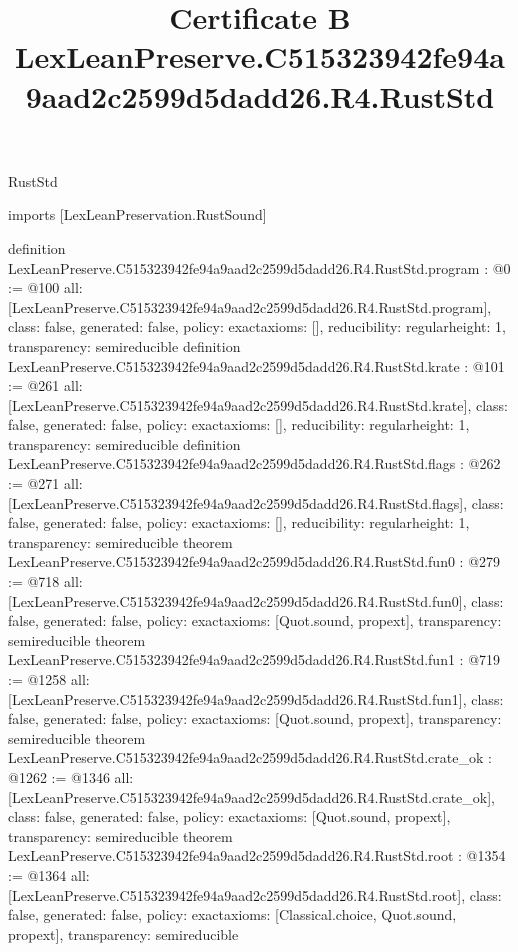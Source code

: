 \begin{lexlean}{RustStd}
\title{Certificate B LexLeanPreserve.C515323942fe94a9aad2c2599d5dadd26.R4.RustStd}
\begin{coremodule}
imports [LexLeanPreservation.RustSound]

definition LexLeanPreserve.C515323942fe94a9aad2c2599d5dadd26.R4.RustStd.program : @0 := @100 {
  all: [LexLeanPreserve.C515323942fe94a9aad2c2599d5dadd26.R4.RustStd.program],
  class: false,
  generated: false,
  policy: exact{axioms: []},
  reducibility: regular{height: 1},
  transparency: semireducible
}
definition LexLeanPreserve.C515323942fe94a9aad2c2599d5dadd26.R4.RustStd.krate : @101 := @261 {
  all: [LexLeanPreserve.C515323942fe94a9aad2c2599d5dadd26.R4.RustStd.krate],
  class: false,
  generated: false,
  policy: exact{axioms: []},
  reducibility: regular{height: 1},
  transparency: semireducible
}
definition LexLeanPreserve.C515323942fe94a9aad2c2599d5dadd26.R4.RustStd.flags : @262 := @271 {
  all: [LexLeanPreserve.C515323942fe94a9aad2c2599d5dadd26.R4.RustStd.flags],
  class: false,
  generated: false,
  policy: exact{axioms: []},
  reducibility: regular{height: 1},
  transparency: semireducible
}
theorem LexLeanPreserve.C515323942fe94a9aad2c2599d5dadd26.R4.RustStd.fun0 : @279 := @718 {
  all: [LexLeanPreserve.C515323942fe94a9aad2c2599d5dadd26.R4.RustStd.fun0],
  class: false,
  generated: false,
  policy: exact{axioms: [Quot.sound, propext]},
  transparency: semireducible
}
theorem LexLeanPreserve.C515323942fe94a9aad2c2599d5dadd26.R4.RustStd.fun1 : @719 := @1258 {
  all: [LexLeanPreserve.C515323942fe94a9aad2c2599d5dadd26.R4.RustStd.fun1],
  class: false,
  generated: false,
  policy: exact{axioms: [Quot.sound, propext]},
  transparency: semireducible
}
theorem LexLeanPreserve.C515323942fe94a9aad2c2599d5dadd26.R4.RustStd.crate_ok : @1262 := @1346 {
  all: [LexLeanPreserve.C515323942fe94a9aad2c2599d5dadd26.R4.RustStd.crate_ok],
  class: false,
  generated: false,
  policy: exact{axioms: [Quot.sound, propext]},
  transparency: semireducible
}
theorem LexLeanPreserve.C515323942fe94a9aad2c2599d5dadd26.R4.RustStd.root : @1354 := @1364 {
  all: [LexLeanPreserve.C515323942fe94a9aad2c2599d5dadd26.R4.RustStd.root],
  class: false,
  generated: false,
  policy: exact{axioms: [Classical.choice, Quot.sound, propext]},
  transparency: semireducible
}


\end{coremodule}
\end{lexlean}

